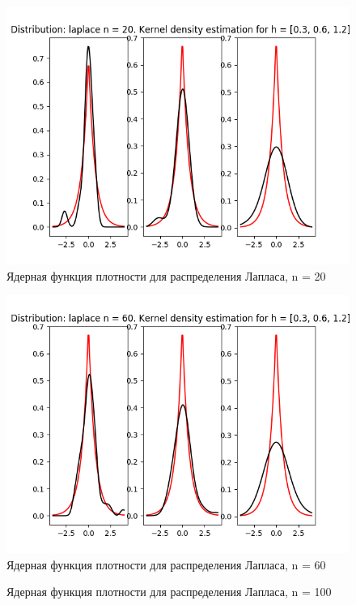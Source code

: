 \documentclass[12pt]{report}
\begin{document}
\begin{center}
    \begin{figure}[H]
 \caption{Ядерная функция плотности для распределения Лапласа, n = 20}
\includegraphics[width=\textwidth]{../lab_4/pic/kernel/d_laplace20.png}
\end{figure}
    \begin{figure}[H]
 \caption{Ядерная функция плотности для распределения Лапласа, n = 60}
\includegraphics[width=\textwidth]{../lab_4/pic/kernel/d_laplace60.png}
\end{figure}
    \begin{figure}[H]
 \caption{Ядерная функция плотности для распределения Лапласа, n = 100}

\end{figure}
\end{center}
\end{document}
